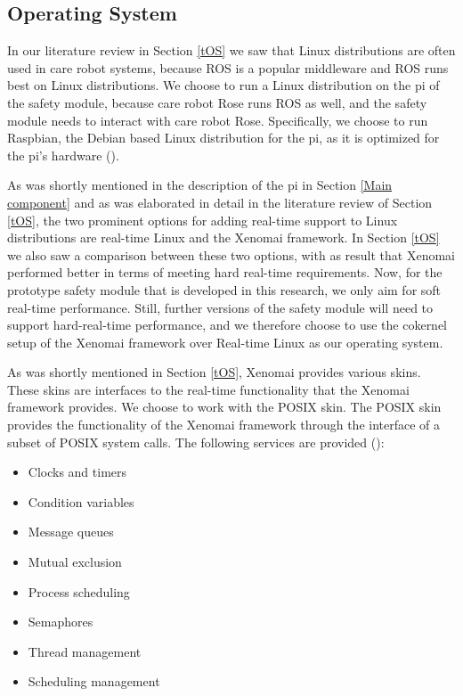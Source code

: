 \documentclass[12pt]{scrreprt}
\begin{document}
\subsection{Operating System}
\label{Operating System}
In our literature review in Section \ref{tOS} we saw that Linux distributions are often used in care robot systems, because ROS is a popular middleware and ROS runs best on Linux distributions. We choose to run a Linux distribution on the \gls{pi} of the safety module, because care robot Rose runs ROS as well, and the safety module needs to interact with care robot Rose. Specifically, we choose to run Raspbian, the Debian based Linux distribution for the \gls{pi}, as it is optimized for the \gls{pi}'s hardware (\cite{raspbian}).
\par
As was shortly mentioned in the description of the \gls{pi} in Section \ref{Main component} and as was elaborated in detail in the literature review of Section \ref{tOS}, the two prominent options for adding real-time support to Linux distributions are real-time Linux and the Xenomai framework. In Section \ref{tOS} we also saw a comparison between these two options, with as result that Xenomai performed better in terms of meeting hard real-time requirements. Now, for the prototype safety module that is developed in this research, we only aim for soft real-time performance. Still, further versions of the safety module will need to support hard-real-time performance, and we therefore choose to use the cokernel setup of the Xenomai framework over Real-time Linux as our operating system.
\par 
As was shortly mentioned in Section \ref{tOS}, Xenomai provides various skins. These skins are interfaces to the real-time functionality that the Xenomai framework provides. We choose to work with the POSIX skin. The POSIX skin provides the functionality of the Xenomai framework through the interface of a subset of POSIX system calls. The following services are provided (\cite{posix_xenomai}):

\begin{itemize}\label{posix_wrapped}
    \item Clocks and timers
    \item Condition variables
    \item Message queues
    \item Mutual exclusion 
    \item Process scheduling 
    \item Semaphores
    \item Thread management
    \item Scheduling management
\end{itemize}
\end{document}
